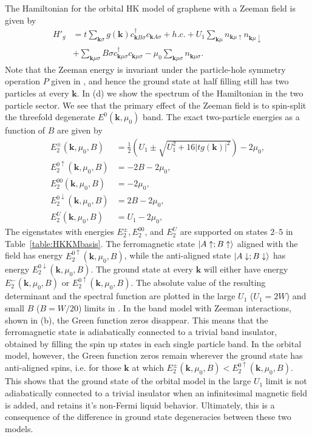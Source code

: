 \documentclass[prb,aps,amssymb,twocolumn,notitlepage]{revtex4-2}
\begin{document}
The Hamiltonian for the orbital HK model of graphene with a Zeeman field is given by
\begin{align}
\label{eq:grapheneorbzeemanH}
H'_{g}&=t\sum_{\mathbf{k}\sigma}g(\mathbf{k})c^\dagger_{\mathbf{k}B\sigma}c_{\mathbf{k}A\sigma}+h.c.+U_{1}\sum_{\mathbf{k}\mu}n_{\mathbf{k}\mu\uparrow}n_{\mathbf{k}\mu\downarrow} \nonumber \\
&+\sum_{\mathbf{k}\mu\sigma}B\sigma c^\dagger_{\mathbf{k}\mu\sigma}c_{\mathbf{k}\mu\sigma}-\mu_0\sum_{\mathbf{k}\mu\sigma}n_{\mathbf{k}\mu\sigma}.
\end{align}
Note that the Zeeman energy is invariant under the particle-hole symmetry operation $P$ given in , and hence the ground state at half filling still has two particles at every $\mathbf{k}$. 
In (d) we show the spectrum of the Hamiltonian in the two particle sector. 
We see that the primary effect of the Zeeman field is to spin-split the threefold degenerate $E^0(\mathbf{k},\mu_0)$ band. 
The exact two-particle energies as a function of $B$ are given by
\begin{align}
\label{eq:twositeZeemanenergies}
    E^\pm_{2}(\mathbf{k},\mu_0,B)&=\frac{1}{2}\left(U_{1}\pm\sqrt{U^2_{1}+16|tg(\mathbf{k})|^2}\right)-2\mu_{0},\nonumber \\
    E^{0\uparrow}_{2}(\mathbf{k},\mu_0,B)&=-2B-2\mu_{0}, \nonumber \\
    E^{00}_{2}(\mathbf{k},\mu_0,B)&=-2\mu_{0}, \\
    E^{0\downarrow}_{2}(\mathbf{k},\mu_0,B)&=2B-2\mu_{0}, \\
    E^U_{2}(\mathbf{k},\mu_0,B)&=U_{1}-2\mu_{0}, \nonumber
\end{align}
The eigenstates with energies $E^{\pm}_{2}, E^{00}_2$, and $E^U_{2}$ are supported on states $2$--$5$ in Table~\ref{table:HKKMbasis}. 
The ferromagnetic state $\ket{A\uparrow;B\uparrow}$ aligned with the field has energy $E^{0\uparrow}_{2}(\mathbf{k},\mu_0,B)$, while the anti-aligned state $\ket{A\downarrow;B\downarrow}$ has energy $E^{0\downarrow}_{2}(\mathbf{k},\mu_0,B)$. 
The ground state at every $\mathbf{k}$ will either have energy $E^-_{2}(\mathbf{k},\mu_0,B)$ or $E^{0\uparrow}_{2}(\mathbf{k},\mu_0,B)$.
The absolute value of the resulting determinant and the spectral function are plotted in the large $U_1$ ($U_1=2W$) and small $B$ ($B=W/20$) limits in . 
In the band model with Zeeman interactions, shown in (b), the Green function zeros disappear. 
This means that the ferromagnetic state is adiabatically connected to a trivial band insulator, obtained by filling the spin up states in each single particle band. 
In the orbital model, however, the Green function zeros remain wherever the ground state has anti-aligned spins, i.e. for those $\mathbf{k}$ at which $E^\pm_{2}(\mathbf{k},\mu_0,B)<E^{0\uparrow}_{2}(\mathbf{k},\mu_0,B)$. 
This shows that the ground state of the orbital model in the large $U_1$ limit is not adiabatically connected to a trivial insulator when an infinitesimal magnetic field is added, and retains it's non-Fermi liquid behavior. 
Ultimately, this is a consequence of the difference in ground state degeneracies between these two models.
\end{document}
